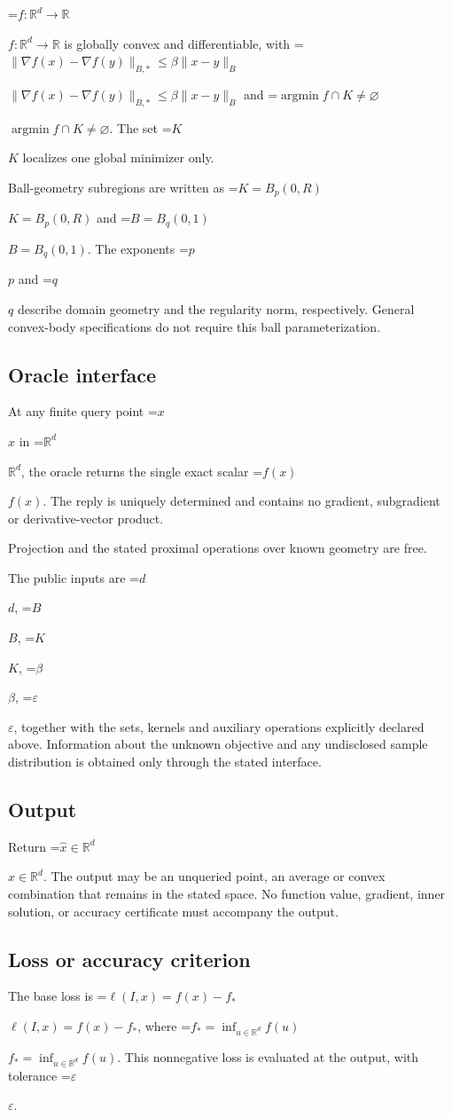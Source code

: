 \documentclass[10pt,a4paper]{article}
\newcommand{\AtlasMath}[1]{\par\begingroup\centering\setbox0=\hbox{$\displaystyle #1$}\ifdim\wd0>1.4\linewidth\typeout{ATLAS WIDE FORMULA: \the\wd0}\fi\ifdim\wd0>\linewidth\resizebox{\linewidth}{!}{\box0}\else\box0\fi\par\endgroup}
\newcommand{\AtlasInlineMath}[1]{\begingroup\setbox0=\hbox{$#1$}\ifdim\wd0>.4\linewidth\endgroup\AtlasMath{#1}\else\endgroup$#1$\fi}
\begin{document}
\AtlasInlineMath{f:\mathbb{R}^d\to\mathbb{R}} is globally convex and differentiable, with \AtlasInlineMath{\|\nabla f(x)-\nabla f(y)\|_{B,*}\le\beta\|x-y\|_B} and \AtlasInlineMath{\operatorname{argmin}f\cap K\ne\varnothing}. The set \AtlasInlineMath{K} localizes one global minimizer only.

Ball-geometry subregions are written as \AtlasInlineMath{K=B_p(0,R)} and \AtlasInlineMath{B=B_q(0,1)}. The exponents \AtlasInlineMath{p} and \AtlasInlineMath{q} describe domain geometry and the regularity norm, respectively. General convex-body specifications do not require this ball parameterization.

\subsection{Oracle interface}
At any finite query point \AtlasInlineMath{x} in \AtlasInlineMath{\mathbb{R}^d}, the oracle returns the single exact scalar \AtlasInlineMath{f(x)}. The reply is uniquely determined and contains no gradient, subgradient or derivative-vector product.

Projection and the stated proximal operations over known geometry are free.

The public inputs are \AtlasInlineMath{d}, \AtlasInlineMath{B}, \AtlasInlineMath{K}, \AtlasInlineMath{\beta}, \AtlasInlineMath{\varepsilon}, together with the sets, kernels and auxiliary operations explicitly declared above. Information about the unknown objective and any undisclosed sample distribution is obtained only through the stated interface.

\subsection{Output}
Return \AtlasInlineMath{\widehat{x}\in \mathbb{R}^d}. The output may be an unqueried point, an average or convex combination that remains in the stated space. No function value, gradient, inner solution, or accuracy certificate must accompany the output.

\subsection{Loss or accuracy criterion}
The base loss is \AtlasInlineMath{\ell(I,x)=f(x)-f_*}, where \AtlasInlineMath{f_*=\inf_{u\in \mathbb{R}^d}f(u)}. This nonnegative loss is evaluated at the output, with tolerance \AtlasInlineMath{\varepsilon}.
\end{document}
